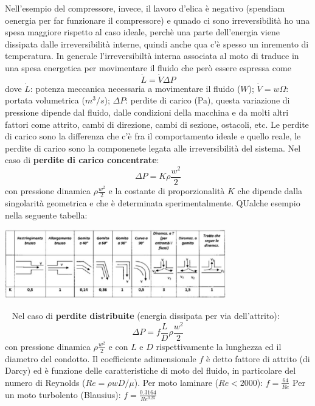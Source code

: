 Nell'esempio del compressore, invece, il lavoro d'elica è negativo (spendiam oenergia per far funzionare il compressore) e qunado ci sono irreversibilità ho una spesa maggiore rispetto al caso ideale, perchè una parte dell'energia viene dissipata dalle irreversibilità interne, quindi anche qua c'è spesso un inremento di temperatura.\newline
\newline
In generale l'irreversibiltà interna associata al moto di traduce in una spesa energetica per movimentare il fluido che però essere espressa come
\[
    \dot{L} = \dot{V} \Delta P
\]
dove \newline
$\dot{L}$: potenza meccanica necessaria a movimentare il fluido ($W$);\newline
$\dot{V} = w \Omega$: portata volumetrica ($m^3/s$); \newline
$\Delta P$: perdite di carico (Pa), questa variazione di pressione dipende dal fluido, dalle condizioni della macchina e da molti altri fattori come attrito, cambi di direzione, cambi di sezione, ostacoli, etc. Le perdite di carico sono la differenza che c'è fra il comportamento ideale e quello reale, le perdite di carico sono la componenete legata alle irreversibilità del sistema.\newline
\newline
Nel caso di \textbf{perdite di carico concentrate}:
\[
    \Delta P = K \rho \frac{w^2}{2}
\]
con pressione dinamica $\rho \frac{w^2}{2}$ e la costante di proporzionalità $K$ che dipende dalla singolarità geometrica e che è determinata sperimentalmente. QUalche esempio nella seguente tabella:
\begin{center}
    \includegraphics[height=3cm]{../L06/img10.PNG}
\end{center}
\ \newline
Nel caso di \textbf{perdite distribuite} (energia dissipata per via dell'attrito):
\[
    \Delta P = f \frac{L}{D} \rho \frac{w^2}{2}
\]
con pressione dinamica $\rho \frac{w^2}{2}$ e con $L$ e $D$ rispettivamente la lunghezza ed il diametro del condotto. Il coefficiente adimensionale $f$ è detto fattore di attrito (di Darcy) ed è funzione delle caratteristiche di moto del fluido, in particolare del numero di Reynolds ($Re = \rho w D /\mu$).\newline
\newline
Per moto laminare ($Re < 2000$): $f = \frac{64}{Re}$\newline
Per un moto turbolento (Blausius): $f = \frac{0.3164}{Re^{0.25}}$